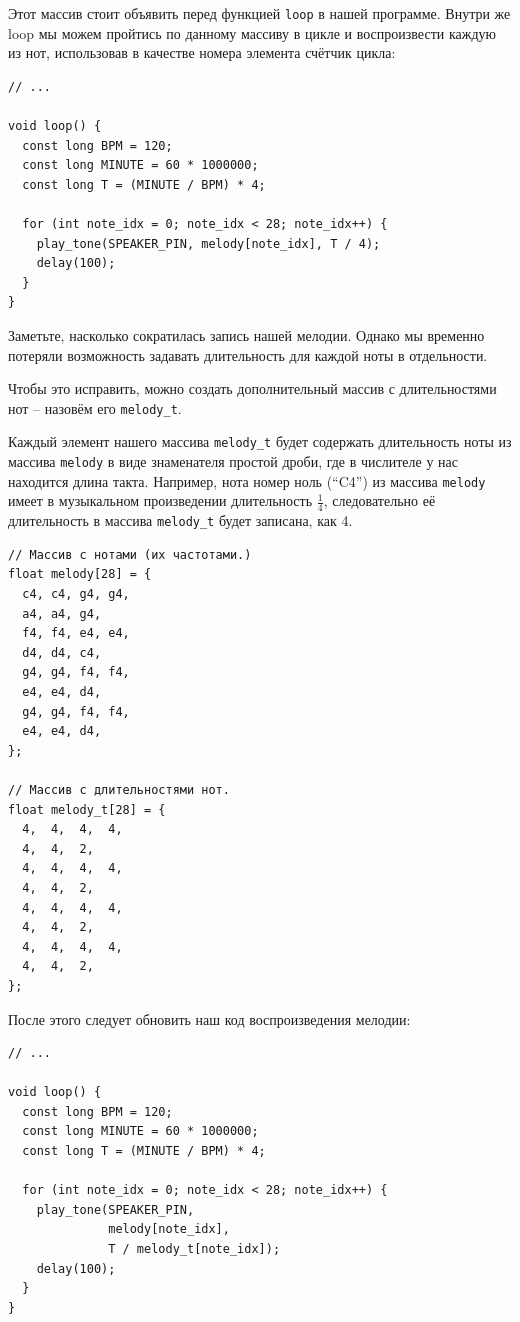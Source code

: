 \documentclass[a4paper,twoside]{book}
\begin{document}
Этот массив стоит объявить перед функцией \texttt{loop} в нашей программе.
Внутри же loop мы можем пройтись по данному массиву в цикле и воспроизвести
каждую из нот, использовав в качестве номера элемента счётчик цикла:

\begin{verbatim}
// ...

void loop() {
  const long BPM = 120;
  const long MINUTE = 60 * 1000000;
  const long T = (MINUTE / BPM) * 4;

  for (int note_idx = 0; note_idx < 28; note_idx++) {
    play_tone(SPEAKER_PIN, melody[note_idx], T / 4);
    delay(100);
  }
}
\end{verbatim}

Заметьте, насколько сократилась запись нашей мелодии. Однако мы временно
потеряли возможность задавать длительность для каждой ноты в отдельности.

Чтобы это исправить, можно создать дополнительный массив с длительностями нот --
назовём его \texttt{melody\_t}.

Каждый элемент нашего массива \texttt{melody\_t} будет содержать длительность
ноты из массива \texttt{melody} в виде знаменателя простой дроби, где в
числителе у нас находится длина такта. Например, нота номер ноль (``C4'') из
массива \texttt{melody} имеет в музыкальном произведении длительность
$\frac{1}{4}$, следовательно её длительность в массива \texttt{melody\_t} будет
записана, как 4.

\begin{verbatim}
// Массив с нотами (их частотами.)
float melody[28] = {
  c4, c4, g4, g4,
  a4, a4, g4,
  f4, f4, e4, e4,
  d4, d4, c4,
  g4, g4, f4, f4,
  e4, e4, d4,
  g4, g4, f4, f4,
  e4, e4, d4,
};

// Массив с длительностями нот.
float melody_t[28] = {
  4,  4,  4,  4,
  4,  4,  2,
  4,  4,  4,  4,
  4,  4,  2,
  4,  4,  4,  4,
  4,  4,  2,
  4,  4,  4,  4,
  4,  4,  2,
};
\end{verbatim}

После этого следует обновить наш код воспроизведения мелодии:

\begin{verbatim}
// ...

void loop() {
  const long BPM = 120;
  const long MINUTE = 60 * 1000000;
  const long T = (MINUTE / BPM) * 4;

  for (int note_idx = 0; note_idx < 28; note_idx++) {
    play_tone(SPEAKER_PIN,
              melody[note_idx],
              T / melody_t[note_idx]);
    delay(100);
  }
}
\end{verbatim}
\end{document}
